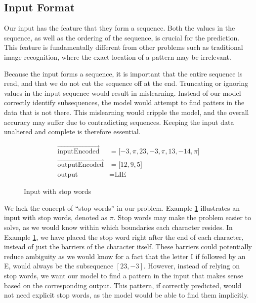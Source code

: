 \subsection{Input Format}
Our input has the feature that they form a sequence. Both the values in the sequence, as well as the ordering of the sequence, is crucial for the prediction. This feature is fundamentally different from other problems such as traditional image recognition, where the exact location of a pattern may be irrelevant.

Because the input forms a sequence, it is important that the entire sequence is read, and that we do not cut the sequence off at the end. Truncating or ignoring values in the input sequence would result in mislearning. Instead of our model correctly identify subsequences, the model would attempt to find patters in the data that is not there. This mislearning would cripple the model, and the overall accuracy may suffer due to contradicting sequences. Keeping the input data unaltered and complete is therefore essential.

\begin{figure}[ht]
    \renewcommand\figurename{Example}
    \begin{equation*}
        \begin{aligned}
           \vec{\text{inputEncoded}}                &= \lbrack -3, \pi, 23, -3, \pi, 13, -14, \pi \rbrack \\
           \vec{\text{outputEncoded}}               &= \lbrack 12, 9, 5 \rbrack \\
           \text{output}                            &= \text{LIE}
        \end{aligned}
    \end{equation*}
    \caption{Input with stop words}
    \label{eq:input_stop_words}
\end{figure}

We lack the concept of ``stop words'' in our problem. Example \ref{eq:input_stop_words} illustrates an input with stop words, denoted as $\pi$. Stop words may make the problem easier to solve, as we would know within which boundaries each character resides. In Example \ref{eq:input_stop_words}, we have placed the stop word right after the end of each character, instead of just the barriers of the character itself. These barriers could potentially reduce ambiguity as we would know for a fact that the letter I if followed by an E, would always be the subsequence \([23, -3]\). However, instead of relying on stop words, we want our model to find a pattern in the input that makes sense based on the corresponding output. This pattern, if correctly predicted, would not need explicit stop words, as the model would be able to find them implicitly.

